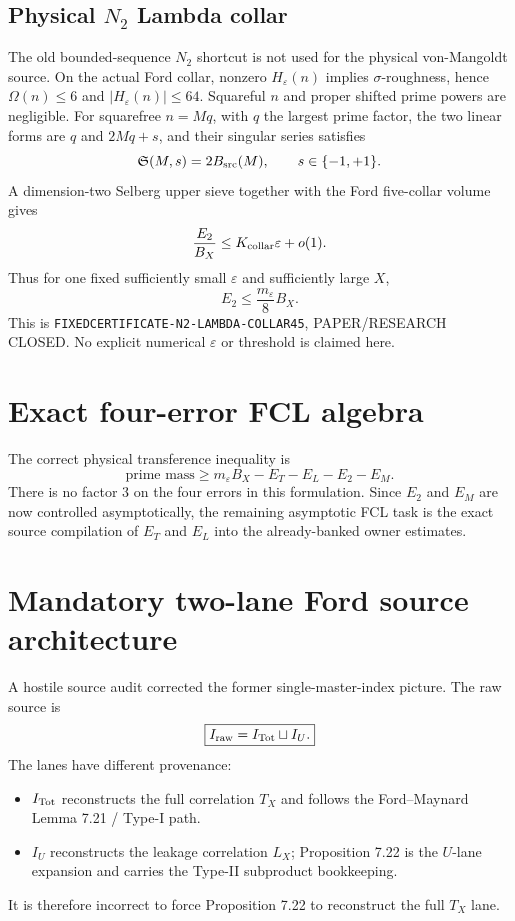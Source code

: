 \documentclass[11pt]{article}
\newcommand{\1}{\mathbf 1}
\newcommand{\status}[1]{\textsf{#1}}
\begin{document}
\subsection{Physical $N_2$ Lambda collar}
The old bounded-sequence $N_2$ shortcut is not used for the physical von-Mangoldt source. On the actual Ford collar, nonzero $H_\varepsilon(n)$ implies $\sigma$-roughness, hence $\Omega(n)\le6$ and $|H_\varepsilon(n)|\le64$. Squareful $n$ and proper shifted prime powers are negligible. For squarefree $n=Mq$, with $q$ the largest prime factor, the two linear forms are $q$ and $2Mq+s$, and their singular series satisfies
\[
 \mathfrak S(M,s)=2B_{\rm src}(M),\qquad s\in\{-1,+1\}.
\]
A dimension-two Selberg upper sieve together with the Ford five-collar volume gives
\[
 \frac{E_2}{B_X}\le K_{\rm collar}\varepsilon+o(1).
\]
Thus for one fixed sufficiently small $\varepsilon$ and sufficiently large $X$,
\[
 \boxed{E_2\le \frac{m_\varepsilon}{8}B_X.}
\]
This is \texttt{FIXEDCERTIFICATE-N2-LAMBDA-COLLAR45}, \status{PAPER/RESEARCH CLOSED}. No explicit numerical $\varepsilon$ or threshold is claimed here.

\section{Exact four-error FCL algebra}
The correct physical transference inequality is
\[
 \boxed{\text{prime mass}\ge m_\varepsilon B_X-E_T-E_L-E_2-E_M.}
\]
There is no factor $3$ on the four errors in this formulation. Since $E_2$ and $E_M$ are now controlled asymptotically, the remaining asymptotic FCL task is the exact source compilation of $E_T$ and $E_L$ into the already-banked owner estimates.

\section{Mandatory two-lane Ford source architecture}
A hostile source audit corrected the former single-master-index picture. The raw source is
\[
 \boxed{I_{\rm raw}=I_{\rm Tot}\sqcup I_U.}
\]
The lanes have different provenance:
\begin{itemize}
\item $I_{\rm Tot}$ reconstructs the full correlation $T_X$ and follows the Ford--Maynard Lemma 7.21 / Type-I path.
\item $I_U$ reconstructs the leakage correlation $L_X$; Proposition 7.22 is the $U$-lane expansion and carries the Type-II subproduct bookkeeping.
\end{itemize}
It is therefore incorrect to force Proposition 7.22 to reconstruct the full $T_X$ lane.
\end{document}
